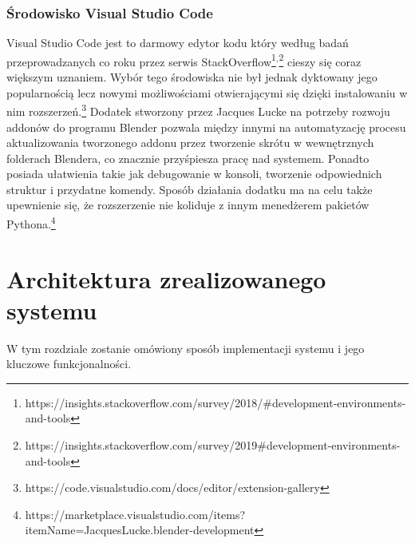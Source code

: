 \documentclass[brudnopis]{xmgr}
\begin{document}

\subsection{Środowisko Visual Studio Code}
Visual Studio Code jest to darmowy edytor kodu który według badań przeprowadzanych co roku przez serwis StackOverflow\footnote{https://insights.stackoverflow.com/survey/2018/\#development-environments-and-tools}$^{,}$\footnote{https://insights.stackoverflow.com/survey/2019\#development-environments-and-tools} cieszy się coraz większym uznaniem. Wybór tego środowiska nie był jednak dyktowany jego popularnością lecz nowymi możliwościami otwierającymi się dzięki instalowaniu w nim rozszerzeń.\footnote{https://code.visualstudio.com/docs/editor/extension-gallery} Dodatek stworzony przez Jacques Lucke na potrzeby rozwoju addonów  do programu Blender pozwala między innymi na automatyzację procesu aktualizowania tworzonego addonu przez tworzenie skrótu w wewnętrznych folderach Blendera, co znacznie przyśpiesza pracę nad systemem. Ponadto posiada ułatwienia takie jak debugowanie w konsoli, tworzenie odpowiednich struktur i przydatne komendy. Sposób działania dodatku ma na celu także upewnienie się, że rozszerzenie nie koliduje z innym menedżerem pakietów Pythona.\footnote{https://marketplace.visualstudio.com/items?itemName=JacquesLucke.blender-development} 





\chapter{Architektura zrealizowanego systemu}
W tym rozdziale zostanie omówiony sposób implementacji systemu i jego kluczowe funkcjonalności.
\end{document}
